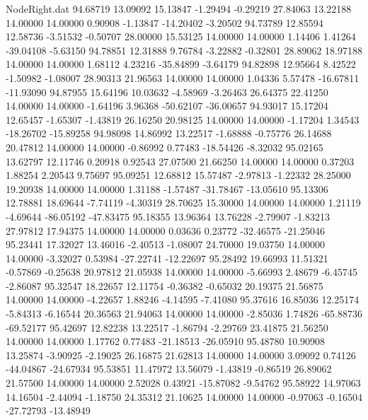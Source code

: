 \begin{filecontents}{NodeRight.dat}
  94.68719   13.09092   15.13847    -1.29494   -0.29219   27.84063   13.22188   14.00000   14.00000    0.90908   -1.13847  -14.20402   -3.20502
  94.73789   12.85594   12.58736    -3.51532   -0.50707   28.00000   15.53125   14.00000   14.00000    1.14406    1.41264  -39.04108   -5.63150
  94.78851   12.31888    9.76784    -3.22882   -0.32801   28.89062   18.97188   14.00000   14.00000    1.68112    4.23216  -35.84899   -3.64179
  94.82898   12.95664    8.42522    -1.50982   -1.08007   28.90313   21.96563   14.00000   14.00000    1.04336    5.57478  -16.67811  -11.93090
  94.87955   15.64196   10.03632    -4.58969   -3.26463   26.64375   22.41250   14.00000   14.00000   -1.64196    3.96368  -50.62107  -36.00657
  94.93017   15.17204   12.65457    -1.65307   -1.43819   26.16250   20.98125   14.00000   14.00000   -1.17204    1.34543  -18.26702  -15.89258
  94.98098   14.86992   13.22517    -1.68888   -0.75776   26.14688   20.47812   14.00000   14.00000   -0.86992    0.77483  -18.54426   -8.32032
  95.02165   13.62797   12.11746     0.20918    0.92543   27.07500   21.66250   14.00000   14.00000    0.37203    1.88254    2.20543    9.75697
  95.09251   12.68812   15.57487    -2.97813   -1.22332   28.25000   19.20938   14.00000   14.00000    1.31188   -1.57487  -31.78467  -13.05610
  95.13306   12.78881   18.69644    -7.74119   -4.30319   28.70625   15.30000   14.00000   14.00000    1.21119   -4.69644  -86.05192  -47.83475
  95.18355   13.96364   13.76228    -2.79907   -1.83213   27.97812   17.94375   14.00000   14.00000    0.03636    0.23772  -32.46575  -21.25046
  95.23441   17.32027   13.46016    -2.40513   -1.08007   24.70000   19.03750   14.00000   14.00000   -3.32027    0.53984  -27.22741  -12.22697
  95.28492   19.66993   11.51321    -0.57869   -0.25638   20.97812   21.05938   14.00000   14.00000   -5.66993    2.48679   -6.45745   -2.86087
  95.32547   18.22657   12.11754    -0.36382   -0.65032   20.19375   21.56875   14.00000   14.00000   -4.22657    1.88246   -4.14595   -7.41080
  95.37616   16.85036   12.25174    -5.84313   -6.16544   20.36563   21.94063   14.00000   14.00000   -2.85036    1.74826  -65.88736  -69.52177
  95.42697   12.82238   13.22517    -1.86794   -2.29769   23.41875   21.56250   14.00000   14.00000    1.17762    0.77483  -21.18513  -26.05910
  95.48780   10.90908   13.25874    -3.90925   -2.19025   26.16875   21.62813   14.00000   14.00000    3.09092    0.74126  -44.04867  -24.67934
  95.53851   11.47972   13.56079    -1.43819   -0.86519   26.89062   21.57500   14.00000   14.00000    2.52028    0.43921  -15.87082   -9.54762
  95.58922   14.97063   14.16504    -2.44094   -1.18750   24.35312   21.10625   14.00000   14.00000   -0.97063   -0.16504  -27.72793  -13.48949

\end{filecontents}

